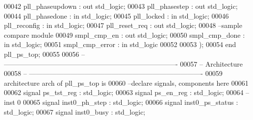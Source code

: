 \begin{DoxyCode}
00042       \textcolor{vhdlchar}{pll_phaseupdown}               \textcolor{vhdlchar}{:} \textcolor{keywordflow}{out} \textcolor{comment}{std\_logic};
00043       \textcolor{vhdlchar}{pll_phasestep}                 \textcolor{vhdlchar}{:} \textcolor{keywordflow}{out} \textcolor{comment}{std\_logic};
00044       \textcolor{vhdlchar}{pll_phasedone}                 \textcolor{vhdlchar}{:} \textcolor{keywordflow}{in} \textcolor{comment}{std\_logic};
00045       \textcolor{vhdlchar}{pll_locked}                    \textcolor{vhdlchar}{:} \textcolor{keywordflow}{in} \textcolor{comment}{std\_logic};
00046       \textcolor{vhdlchar}{pll_reconfig}                  \textcolor{vhdlchar}{:} \textcolor{keywordflow}{in} \textcolor{comment}{std\_logic};
00047       \textcolor{vhdlchar}{pll_reset_req}                 \textcolor{vhdlchar}{:} \textcolor{keywordflow}{out} \textcolor{comment}{std\_logic};
00048 \textcolor{keyword}{      --sample compare module}
00049       \textcolor{vhdlchar}{smpl_cmp_en}                   \textcolor{vhdlchar}{:} \textcolor{keywordflow}{out} \textcolor{comment}{std\_logic};
00050       \textcolor{vhdlchar}{smpl_cmp_done}                 \textcolor{vhdlchar}{:} \textcolor{keywordflow}{in} \textcolor{comment}{std\_logic};
00051       \textcolor{vhdlchar}{smpl_cmp_error}                \textcolor{vhdlchar}{:} \textcolor{keywordflow}{in} \textcolor{comment}{std\_logic}
00052             
00053       \textcolor{vhdlchar}{)};
00054 \textcolor{keywordflow}{end} \textcolor{vhdlchar}{pll\_ps\_top};
00055 
00056 \textcolor{keyword}{-- ----------------------------------------------------------------------------}
00057 \textcolor{keyword}{-- Architecture}
00058 \textcolor{keyword}{-- ----------------------------------------------------------------------------}
00059 \textcolor{keywordflow}{architecture} arch \textcolor{keywordflow}{of} pll_ps_top is
00060 \textcolor{keyword}{--declare signals,  components here}
00061 
00062 \textcolor{keywordflow}{signal} \textcolor{vhdlchar}{ps_tst_reg}       \textcolor{vhdlchar}{:} \textcolor{comment}{std\_logic};
00063 \textcolor{keywordflow}{signal} \textcolor{vhdlchar}{ps_en_reg}        \textcolor{vhdlchar}{:} \textcolor{comment}{std\_logic};
00064 \textcolor{keyword}{--inst 0}
00065 \textcolor{keywordflow}{signal} \textcolor{vhdlchar}{inst0_ph_step}    \textcolor{vhdlchar}{:} \textcolor{comment}{std\_logic};
00066 \textcolor{keywordflow}{signal} \textcolor{vhdlchar}{inst0_ps_status}  \textcolor{vhdlchar}{:} \textcolor{comment}{std\_logic};
00067 \textcolor{keywordflow}{signal} \textcolor{vhdlchar}{inst0_busy}       \textcolor{vhdlchar}{:} \textcolor{comment}{std\_logic};

\end{DoxyCode}
